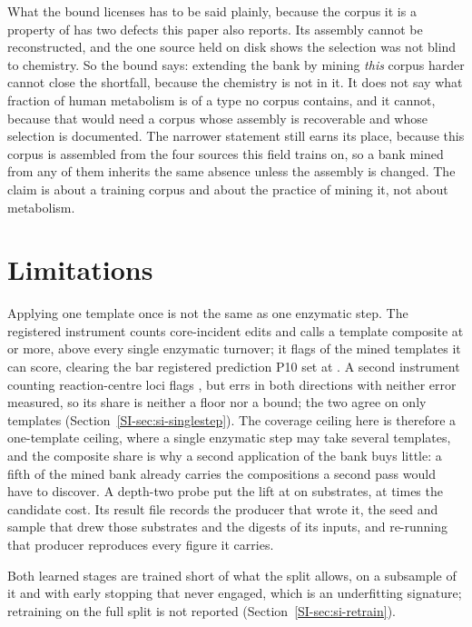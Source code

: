 What the bound licenses has to be said plainly, because the corpus it is a property of has two
defects this paper also reports. Its assembly cannot be reconstructed, and the one source held on
disk shows the selection was not blind to chemistry. So the bound says: extending the bank by
mining \emph{this} corpus harder cannot close the shortfall, because the chemistry is not in it. It
does not say what fraction of human metabolism is of a type no corpus contains, and it cannot,
because that would need a corpus whose assembly is recoverable and whose selection is documented.
The narrower statement still earns its place, because this corpus is assembled from the
four sources this field trains on, so a bank mined from any of them inherits the same absence
unless the assembly is changed. The claim is about a training corpus and about the practice of
mining it, not about metabolism.

\section{Limitations}
\label{sec:limitations}

Applying one template once is not the same as one enzymatic step. The registered instrument counts
core-incident edits and calls a template composite at \numCompositeThreshold{} or more, above every
single enzymatic turnover; it flags \numCompositeEditsharePct{} of the mined templates it can
score, clearing the bar registered prediction P10 set at \numCompositeBarPct{}. A second instrument
counting reaction-centre loci flags \numCompositeLocisharePct{}, but errs in both directions with
neither error measured, so its share is neither a floor nor a bound; the two agree on only
\numCompositeBoth{} templates (Section~\ref{SI-sec:si-singlestep}). The coverage ceiling here is
therefore a one-template ceiling, where a single enzymatic step may take several templates, and the composite share is why a second
application of the bank buys little: a fifth of the mined bank already carries the compositions a
second pass would have to discover. A depth-two probe put the lift at \numDepthtwoLift{} on
\numDepthtwoSubstrates{} substrates, at \numDepthtwoCost{} times the candidate cost. Its result
file records the producer that wrote it, the seed and sample that drew those substrates and the
digests of its inputs, and re-running that producer reproduces every figure it carries.

Both learned stages are trained short of what the split allows, on a subsample of it and with early stopping that never engaged, which is an underfitting signature; retraining on the full split is not reported (Section~\ref{SI-sec:si-retrain}).

